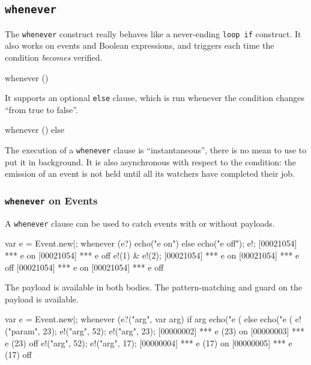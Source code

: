 \subsection{\lstinline|whenever|}

The \lstinline|whenever| construct really behaves like a never-ending
\lstinline|loop if| construct.  It also works on events and Boolean
expressions, and triggers each time the condition \emph{becomes}
verified.

\begin{urbiunchecked}
whenever ()
\end{urbiunchecked}

It supports an optional \lstinline|else| clause, which is run whenever
the condition changes ``from true to false''.

\begin{urbiunchecked}
whenever ()
else
\end{urbiunchecked}

The execution of a \lstinline|whenever| clause is ``instantaneous'',
there is no mean to use \samp{,} to put it in background.  It is also
asynchronous with respect to the condition: the emission of an event
is not held until all its watchers have completed their job.

\subsubsection{\lstinline'whenever' on Events}

A \lstinline'whenever' clause can be used to catch events with or
without payloads.

\begin{urbiscript}
var e = Event.new|;
whenever (e?)
  echo("e on")
else
  echo("e off");
e!;
[00021054] *** e on
[00021054] *** e off
e!(1) & e!(2);
[00021054] *** e on
[00021054] *** e off
[00021054] *** e on
[00021054] *** e off
\end{urbiscript}

The payload is available in both bodies.  The pattern-matching and
guard on the payload is available.

\begin{urbiscript}
var e = Event.new|;
whenever (e?("arg", var arg) if arg %
  echo("e (%
else
  echo("e (%
e!("param", 23);
e!("arg", 52);
e!("arg", 23);
[00000002] *** e (23) on
[00000003] *** e (23) off
e!("arg", 52);
e!("arg", 17);
[00000004] *** e (17) on
[00000005] *** e (17) off
\end{urbiscript}


